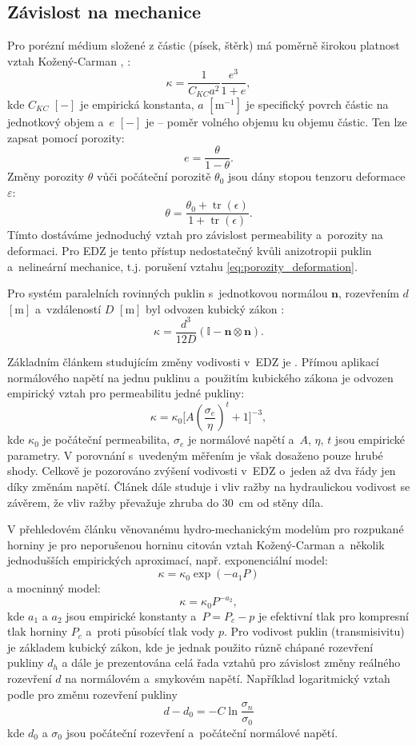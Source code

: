 \documentclass{article}
\def\eps{\varepsilon}
\def\tr{\operatorname{tr}}
\def\vc#1{\mathbf{\boldsymbol{#1}}}     %
\def\tn#1{{\mathbb{#1}}}    %
\begin{document}
\subsection{Závislost na mechanice}
\label{sec:empiricke}

Pro porézní médium složené z částic (písek, štěrk) má poměrně širokou platnost vztah Kožený-Carman \cite{Carman1956}, \cite{Carrier2003}:
\begin{equation}
  \label{eq:Kozeny}
  \kappa = \frac{1}{C_{KC}a^2}\frac{e^3}{1+e},
\end{equation}
kde $C_{KC}$ $[-]$ je empirická konstanta, $a$  $[\mathrm{m}^{-1}]$ je specifický povrch částic na jednotkový objem a~$e$ $[-]$ je   --
poměr volného objemu ku objemu částic. Ten lze zapsat pomocí porozity:
\[
   e = \frac{\theta}{1 - \theta}.
\]
Změny porozity $\theta$ vůči počáteční porozitě $\theta_0$ jsou dány stopou tenzoru deformace $\eps$:
\begin{equation}
   \label{eq:porozity_deformation}
   \theta = \frac{\theta_0 + \tr(\epsilon)}{1 + \tr(\epsilon)}.
\end{equation}
Tímto dostáváme jednoduchý vztah pro závislost permeability a~porozity na deformaci. Pro EDZ je tento přístup nedostatečný kvůli anizotropii
puklin a~nelineární mechanice, t.j.  porušení vztahu \eqref{eq:porozity_deformation}.

Pro systém paralelních rovinných puklin s~jednotkovou normálou $\vc n$, rozevřením $d$ $[\mathrm{m}]$ a~vzdáleností $D$ $[\mathrm{m}]$
byl odvozen kubický zákon \cite{Snow1969}:
\[
 \kappa = \frac{d^3}{12 D} (\tn I - \vc n \otimes \vc n).
\]

Základním článkem studujícím změny vodivosti v~EDZ je \cite{Kelsall1984}. Přímou aplikací normálového napětí
na jednu puklinu a~použitím kubického zákona je odvozen empirický vztah pro permeabilitu jedné pukliny:
\[
  \kappa = \kappa_0 \Big[A (\frac{\sigma_e}{\eta})^t+1\Big]^{-3},
\]
kde $\kappa_0$ je počáteční permeabilita, $\sigma_e$ je normálové napětí a~$A$, $\eta$, $t$ jsou empirické parametry.
V porovnání s~uvedeným měřením je však dosaženo pouze hrubé shody. Celkově je pozorováno zvýšení vodivosti v~EDZ o~jeden až dva řády jen díky změnám napětí.
Článek dále studuje i vliv ražby na hydraulickou vodivost se závěrem, že vliv ražby převažuje zhruba do 30~cm od stěny díla. 


V přehledovém článku \cite{Rutqvist2003} věnovanému hydro-mechanickým modelům pro rozpukané horniny
je pro neporušenou horninu citován vztah Kožený-Carman a~několik jednodušších empirických aproximací, např.
exponenciální model:
\[
  \kappa=\kappa_0 \exp(-a_1 P)
\]
a 
mocninný model:
\[
  \kappa=\kappa_0 P^{-a_2},
\]
kde $a_1$ a $a_2$ jsou empirické konstanty a~$P=P_c - p$ je efektivní tlak pro kompresní tlak horniny $P_c$ a~proti působící tlak vody $p$.
Pro vodivost puklin (transmisivitu) je základem kubický zákon, kde je jednak použito různě chápané  rozevření pukliny $d_h$ 
a dále je prezentována celá řada vztahů pro závislost změny reálného rozevření $d$ na normálovém a~smykovém napětí. Například logaritmický vztah 
podle \cite{Kohl1995} pro změnu rozevření pukliny
\[
   d - d_0 = - C \ln \frac{\sigma_n}{\sigma_0}
\]
kde $d_0$ a $\sigma_0$ jsou počáteční rozevření a~počáteční normálové napětí. 
\end{document}
